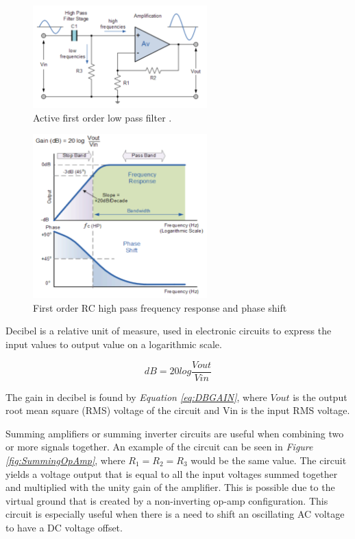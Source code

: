 \begin{figure}[h]
    \centering
    \includegraphics[width=0.60\textwidth]{graphics/highPassFilter.png}
    \caption{Active first order low pass filter \cite{noauthor_active_2013}.}
    \label{fig:HighPassFiler}
\end{figure}

\begin{figure}[h]
    \centering
    \includegraphics[width=0.60\textwidth]{graphics/highPassResponse.png}
    \caption{First order RC high pass frequency response and phase shift \cite{noauthor_high_2013}}
    \label{fig:HighPassResponse}
\end{figure}

\clearpage

Decibel is a relative unit of measure, used in electronic circuits to express the input values to output value on a logarithmic scale.  

\begin{equation}
    dB = 20log\frac{V{out}}{V{in}}
    \label{eq:DBGAIN}
\end{equation}

The gain in decibel is found by \textit{Equation \ref{eq:DBGAIN}}, where $V{out}$ is the output root mean square (RMS) voltage of the circuit and V{in} is the input RMS voltage.

Summing amplifiers or summing inverter circuits are useful when combining two or more signals together.
An example of the circuit can be seen in \textit{Figure \ref{fig:SummingOpAmp}}, where $R_1 = R_2 = R_3$ would be the same value.
The circuit yields a voltage output that is equal to all the input voltages summed together and multiplied with the unity gain of the amplifier.
This is possible due to the virtual ground that is created by a non-inverting op-amp configuration\cite{noauthor_summing_2013}. 
This circuit is especially useful when there is a need to shift an oscillating AC voltage to have a DC voltage offset.


